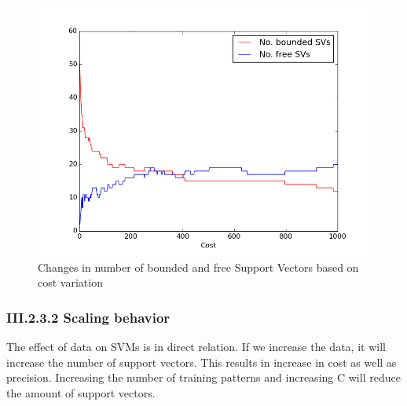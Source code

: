 \documentclass[12pt]{article}
\begin{document}
      \begin{figure}[h]
        \centering
        \includegraphics[width =1\textwidth]{figures/SVplot.png}
        \caption{Changes in number of bounded and free Support Vectors based on cost variation}
        \label{figure:SV}
      \end{figure}

      \subsubsection*{III.2.3.2 Scaling behavior}

        The effect of data on SVMs is in direct relation. If we increase the data, it will increase the number of support vectors. This results in increase in cost as well as precision. Increasing the number of training patterns and increasing C will reduce the amount of support vectors.
\end{document}
